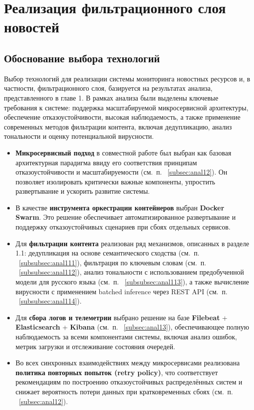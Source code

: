\newpage

\section{Реализация фильтрационного слоя новостей}

\subsection{Обоснование выбора технологий}
Выбор технологий для реализации системы мониторинга новостных ресурсов и, в частности, фильтрационного слоя, базируется на результатах анализа, представленного в главе 1.
В рамках анализа были выделены ключевые требования к системе: поддержка масштабируемой микросервисной архитектуры, обеспечение отказоустойчивости, высокая наблюдаемость, а также применение современных методов фильтрации контента, включая дедупликацию, анализ тональности и оценку потенциальной вирусности.
\begin{itemize}
    \item \textbf{Микросервисный подход} в совместной работе был выбран как базовая архитектурная парадигма ввиду его соответствия принципам отказоустойчивости и масштабируемости (см.\ п. ~\ref{subsec:anal12}).
    Он позволяет изолировать критически важные компоненты, упростить развертывание и ускорить развитие системы.
    \item В качестве \textbf{инструмента оркестрации контейнеров} выбран \textbf{Docker Swarm}.
    Это решение обеспечивает автоматизированное развертывание и поддержку отказоустойчивых сценариев при сбоях отдельных сервисов.
    \item Для \textbf{фильтрации контента} реализован ряд механизмов, описанных в разделе 1.1: дедупликация на основе семантического сходства (см.\ п. ~\ref{subsubsec:anal111}), фильтрация по ключевым словам (см.\ п. ~\ref{subsubsec:anal112}), анализ тональности с использованием предобученной модели для русского языка (см.\ п. ~\ref{subsubsec:anal113}), а также вычисление вирусности с применением batched inference через REST API (см.\ п. ~\ref{subsubsec:anal114}).
    \item Для \textbf{сбора логов и телеметрии} выбрано решение на базе \textbf{Filebeat} + \textbf{Elasticsearch} + \textbf{Kibana} (см.\ п. ~\ref{subsec:anal13}), обеспечивающее полную наблюдаемость за всеми компонентами системы, включая анализ ошибок, метрик загрузки и отслеживание состояния очередей.
    \item Во всех синхронных взаимодействиях между микросервисами реализована \textbf{политика повторных попыток (retry policy)}, что соответствует рекомендациям по построению отказоустойчивых распределённых систем и снижает вероятность потери данных при кратковременных сбоях (см.\ п. ~\ref{subsec:anal12}).
\end{itemize}

